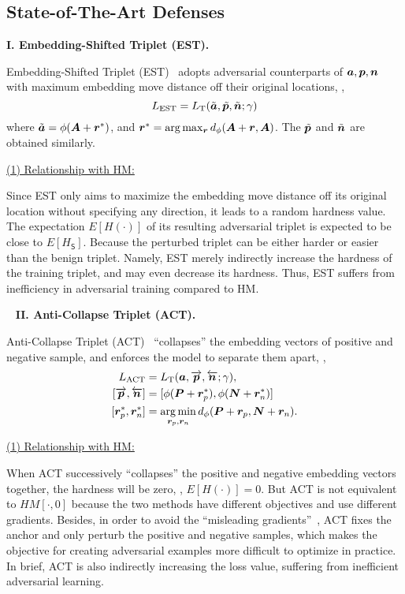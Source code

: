 \subsection{State-of-The-Art Defenses}
\label{sec:b1}

\noindent\textbf{I. Embedding-Shifted Triplet (EST).}~\cite{advrank}

Embedding-Shifted Triplet (EST)~\cite{advrank} adopts adversarial counterparts
of ${\bm{a}},{\bm{p}},{\bm{n}}$ with maximum embedding move distance off their original
locations, \ie,
%
\begin{equation}
%
L_\text{EST}=L_\text{T}(\tilde{\va},\tilde{\vp},\tilde{\vn};\gamma)
%
\end{equation}
%
where
$\tilde{{\bm{a}}}=\phi({\bm{A}}+{\bm{r}}^*)$, and ${\bm{r}}^*=\arg\max_{{\bm{r}}}d_\phi({\bm{A}}+{\bm{r}}, {\bm{A}})$.
%
The $\tilde{{\bm{p}}}$ and $\tilde{{\bm{n}}}$ are obtained similarly.

\ul{(1) Relationship with HM:}

Since EST only aims to maximize the embedding move distance off its original
location without specifying any direction, it leads to a random hardness value.
%
The expectation $E[H(\cdot)]$ of its resulting adversarial triplet is expected
to be close to $E[H_\mathsf{S}]$.
%
Because the perturbed triplet can be either harder or easier than the benign
triplet.
%
Namely, EST merely indirectly increase the hardness of the training triplet,
and may even decrease its hardness.
%
Thus, EST suffers from inefficiency in adversarial training compared to HM.

~\newline
\noindent\textbf{II. Anti-Collapse Triplet (ACT).}~\cite{robrank}

Anti-Collapse Triplet (ACT)~\cite{robrank} ``collapses'' the embedding vectors
of positive and negative sample, and enforces the model to separate them apart,
\ie,
%
\begin{align}
%
	L_\text{ACT} &=L_\text{T}(\va, \overrightarrow{\vp},
\overleftarrow{\vn};\gamma),\\
%
	[\overrightarrow{\vp},\overleftarrow{\vn}] & =[\phi(\mP+\vr_p^*), \phi(\mN+\vr_n^*)]\\
%
	[\vr_p^*,\vr_n^*] &= \argmin_{\vr_p,\vr_n} d_\phi(\mP+\vr_p, \mN+\vr_n).
%
\end{align}

\ul{(1) Relationship with HM:}

When ACT successively ``collapses'' the positive and negative embedding
vectors together, the hardness will be zero, \ie, $E[H(\cdot)]=0$.
%
But ACT is not equivalent to $HM[\cdot,0]$ because the two methods have
different objectives and use different gradients.
%
Besides, in order to avoid the ``misleading gradients''~\cite{robrank}, ACT
fixes the anchor and only perturb the positive and negative samples, which
makes the objective for creating adversarial examples more difficult to
optimize in practice.
%
In brief, ACT is also indirectly increasing the loss value, suffering from
inefficient adversarial learning.


